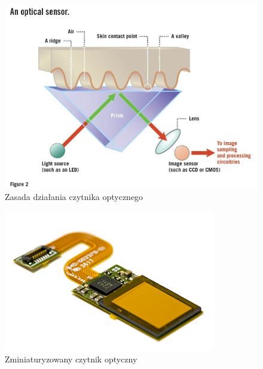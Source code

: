 \documentclass{beamer}
\begin{document}
\begin{frame}
    \begin{figure}[t]
        \centering
        \includegraphics[width=0.85\linewidth]{types/Optical-fingerprint-scanner-840x610.jpg}
        \caption{Zasada działania czytnika optycznego}
    \end{figure}
\end{frame}

\begin{frame}
    \begin{figure}[t]
        \centering
        \includegraphics[width=0.85\linewidth]{types/Synaptics_Clear_ID_optical_fingerprint_sensor.png}
        \caption{Zminiaturyzowany czytnik optyczny}
    \end{figure}
\end{frame}
\end{document}
